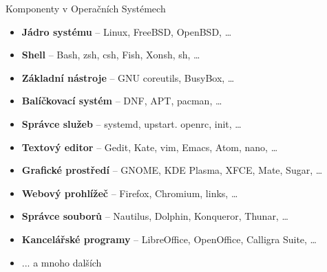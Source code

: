 \documentclass{beamer}
\begin{document}
\begin{frame}{}
	\begin{block}{Komponenty v Operačních Systémech}
		\begin{itemize}
			\item \textbf{Jádro systému} – Linux, FreeBSD, OpenBSD, …
			\item \textbf{Shell} – Bash, zsh, csh, Fish, Xonsh, sh, …
			\item \textbf{Základní nástroje} – GNU coreutils, BusyBox, …
			\item \textbf{Balíčkovací systém} – DNF, APT, pacman, …
			\item \textbf{Správce služeb} – systemd, upstart. openrc, init, …
			\item \textbf{Textový editor} – Gedit, Kate, vim, Emacs, Atom, nano, …
   		    \item \textbf{Grafické prostředí} – GNOME, KDE Plasma, XFCE, Mate, Sugar, …
	        \item \textbf{Webový prohlížeč} – Firefox, Chromium, links, …
   		    \item \textbf{Správce souborů} – Nautilus, Dolphin, Konqueror, Thunar, …
   		    \item \textbf{Kancelářské programy} – LibreOffice, OpenOffice, Calligra Suite, …
			\item ... a mnoho dalších
		\end{itemize}
	\end{block}
\end{frame}
\end{document}
